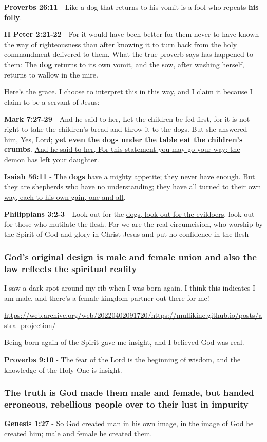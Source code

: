 \documentclass[11pt]{article}
\begin{document}
\textbf{Proverbs 26:11} - Like a dog that returns to his vomit is a fool who repeats \textbf{his folly}.

\textbf{II Peter 2:21-22} - For it would have been better for them never to have known the way of righteousness than after knowing it to turn back from the holy commandment delivered to them. What the true proverb says has happened to them: The \textbf{dog} returns to its own vomit, and the sow, after washing herself, returns to wallow in the mire.

Here's the grace. I choose to interpret this in this way, and I claim it because I claim to be a servant of Jesus:

\textbf{Mark 7:27-29} - And he said to her, Let the children be fed first, for it is not right to take the children's bread and throw it to the dogs. But she answered him, Yes, Lord; \textbf{yet even the dogs under the table eat the children's crumbs}. \uline{And he said to her, For this statement you may go your way; the demon has left your daughter}.

\textbf{Isaiah 56:11} - The \textbf{dogs} have a mighty appetite; they never have enough. But they are shepherds who have no understanding; \uline{they have all turned to their own way, each to his own gain, one and all}.

\textbf{Philippians 3:2-3} - Look out for the \uline{dogs, look out for the evildoers}, look out for those who mutilate the flesh. For we are the real circumcision, who worship by the Spirit of God and glory in Christ Jesus and put no confidence in the flesh—

\subsubsection{God's original design is male and female union and also the law reflects the spiritual reality}
\label{sec:org2135204}

I saw a dark spot around my rib when I was born-again.
I think this indicates I am male, and there's a female kingdom partner out there for me!

\url{https://web.archive.org/web/20220402091720/https://mullikine.github.io/posts/astral-projection/}

Being born-again of the Spirit gave me insight, and I believed God was real.

\textbf{Proverbs 9:10} - The fear of the Lord is the beginning of wisdom, and the knowledge of the Holy One is insight.

\subsubsection{The truth is God made them male and female, but handed erroneous, rebellious people over to their lust in impurity}
\label{sec:org1c73f2c}
\textbf{Genesis 1:27} - So God created man in his own image, in the image of God he created him; male and female he created them.
\end{document}
